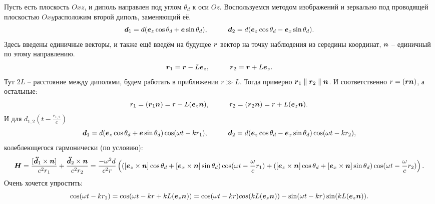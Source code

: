 
Пусть есть плоскость $Oxz$, и диполь направлен под углом $\theta_d$ к оси $Oz$.
Воспользуемся методом изображений и зеркально под проводящей плоскостью $Oxy$расположим второй диполь, заменяющий её.
\begin{equation*}
    \mbox{\boldmath $d$}_1 = d (\mbox{\boldmath $e$}_z\cos \theta_d + \mbox{\boldmath $e$} \sin \theta_d),
    \hspace{1 cm}
    \mbox{\boldmath $d$}_2 = d (\mbox{\boldmath $e$}_z \cos \theta_d  - \mbox{\boldmath $e$}_x \sin \theta_d).
\end{equation*}
Здесь введены единичные векторы, и также ещё введём на будущее $\mbox{\boldmath $r$}$ вектор на точку наблюдения из середины координат, $\mbox{\boldmath $n$}$ -- единичный по этому направлению.
\begin{equation*}
    \mbox{\boldmath $r$}_1 = \mbox{\boldmath $r$} - L \mbox{\boldmath $e$}_z,
    \hspace{1 cm}
    \mbox{\boldmath $r$}_2 = \mbox{\boldmath $r$} + L \mbox{\boldmath $e$}_z.
\end{equation*}
Тут $2L$ -- расстояние между диполями, будем работать в приближении $r \gg L$. Тогда примерно $\mbox{\boldmath $r$}_1 \parallel \mbox{\boldmath $r$}_2 \parallel \mbox{\boldmath $n$}$. 
И соответственно $r = (\mbox{\boldmath $r$} \mbox{\boldmath $n$})$, а остальные: \begin{equation*}
    r_1 = (\mbox{\boldmath $r$}_1 \mbox{\boldmath $n$}) = r - L (\mbox{\boldmath $e$}_z \mbox{\boldmath $n$}),
    \hspace{1 cm}
    r_2 = (\mbox{\boldmath $r$}_2 \mbox{\boldmath $n$}) = r + L (\mbox{\boldmath $e$}_z \mbox{\boldmath $n$}).
\end{equation*}
И для $d_{1,2} (t - \frac{r_{1,2}}{c})$
\begin{equation*}
    \mbox{\boldmath $d$}_1 = d (\mbox{\boldmath $e$}_z\cos \theta_d + \mbox{\boldmath $e$} \sin \theta_d) \cos (\omega t - k r_1),
    \hspace{1 cm}
    \mbox{\boldmath $d$}_2 = d (\mbox{\boldmath $e$}_z \cos \theta_d  - \mbox{\boldmath $e$}_x \sin \theta_d) \cos (\omega t - k r_2),
\end{equation*}
колеблеющегося гармонически (по условию):
\begin{equation*}
    \mbox{\boldmath $H$} = \frac{[\mbox{\boldmath $\ddot{d}$}_1 \times \mbox{\boldmath $n$}]}{c^2 r_1} + \frac{\mbox{\boldmath $\ddot{d}$}_2 \times \mbox{\boldmath $n$}}{c^2 r_2}
    =
    \frac{- \omega^2 d}{c^2 r} \left(( [\mbox{\boldmath $e$}_z \times \mbox{\boldmath $n$}] \cos \theta_d 
    + [\mbox{\boldmath $e$}_x \times \mbox{\boldmath $n$}] \sin \theta_d) \cos(\omega t - \frac{\omega}{c}r_1)
    +
( [\mbox{\boldmath $e$}_z \times \mbox{\boldmath $n$}] \cos \theta_d 
    + [\mbox{\boldmath $e$}_x \times \mbox{\boldmath $n$}] \sin \theta_d) \cos(\omega t - \frac{\omega}{c}r_2)
    \right).
\end{equation*}
Очень хочется упростить: 
\begin{equation*}
    \cos(\omega t - k r_1) = \cos (\omega t - k r + k L (\mbox{\boldmath $e$}_z \mbox{\boldmath $n$}))
    =
    \cos(\omega t - k r) cos (k L (\mbox{\boldmath $e$}_z \mbox{\boldmath $n$}))    - \sin (\omega t - k r) \sin (k L (\mbox{\boldmath $e$}_z \mbox{\boldmath $n$})).
\end{equation*}
